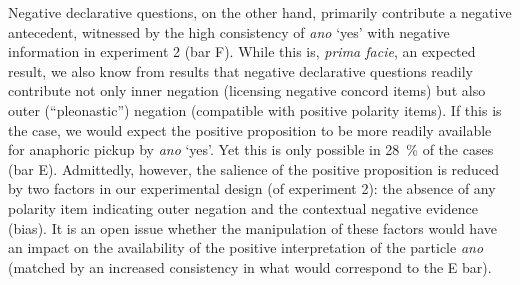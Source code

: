\documentclass[output=paper,colorlinks,citecolor=brown]{langscibook}
\begin{document}
Negative declarative questions, on the other hand, primarily contribute a negative antecedent, witnessed by the high consistency of \textit{ano} `yes' with negative information in experiment 2 (bar F). While this is, \textit{prima facie}, an expected result, we also know from  results that negative declarative questions readily contribute not only inner negation (licensing negative concord items) but also outer (``pleonastic'') negation (compatible with positive polarity items). If this is the case, we would expect the positive proposition to be more readily available for anaphoric pickup by \textit{ano} `yes'. Yet this is only possible in \qty{28}{\percent} of the cases (bar E). Admittedly, however, the salience of the positive proposition is reduced by two factors in our experimental design (of experiment 2): the absence of any polarity item indicating outer negation and the contextual negative evidence (bias). It is an open issue whether the manipulation of these factors would have an impact on the availability of the positive interpretation of the particle \textit{ano} (matched by an increased consistency in what would correspond to the E bar).



\end{document}
